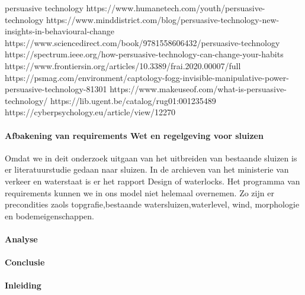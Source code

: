 persuasive technology 
https://www.humanetech.com/youth/persuasive-technology 
\cite{humanTechpersuasiveTech}
https://www.minddistrict.com/blog/persuasive-technology-new-insights-in-behavioural-change 
https://www.sciencedirect.com/book/9781558606432/persuasive-technology 
https://spectrum.ieee.org/how-persuasive-technology-can-change-your-habits 
\cite{rezenfeld01012018persuasiveTecgHabits}
https://www.frontiersin.org/articles/10.3389/frai.2020.00007/full 
\cite{aldenaini28042020persuasiveTechTrends}
https://psmag.com/environment/captology-fogg-invisible-manipulative-power-persuasive-technology-81301 
\cite{larson14062017persuasivetechmanipulates}
https://www.makeuseof.com/what-is-persuasive-technology/ 
\cite{tanzem22012022persuasivetechchanginglives}
https://lib.ugent.be/catalog/rug01:001235489 
https://cyberpsychology.eu/article/view/12270 
\cite{tikkakuddonenpersuasiveTechnology}
\paragraph{Afbakening van requirements Wet en regelgeving voor sluizen}
Omdat we in deit onderzoek uitgaan van het uitbreiden van bestaande sluizen is er literatuurstudie gedaan naar sluizen. In de archieven van het ministerie van verkeer en waterstaat is er het rapport Design of waterlocks\cite{CivilEngineeringDivision}.
Het programma van requirements kunnen we in ons model niet helemaal overnemen. 
Zo zijn er precondities zaols topgrafie,bestaande watersluizen,waterlevel, wind, morphologie en bodemeigenschappen.

 

\paragraph{Analyse}
\paragraph{Conclusie}

 


\paragraph{Inleiding}


\begin{center}
\end{center}













